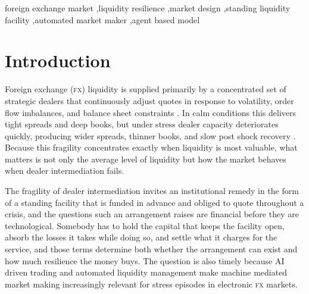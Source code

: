 \documentclass[a4paper,fleqn]{cas-sc}
\newcommand{\acro}[1]{\textsc{\MakeLowercase{#1}}\xspace}
\newcommand{\FX}{\acro{FX}}
\begin{document}
\begin{keywords}
foreign exchange market \sep liquidity resilience \sep market design \sep standing liquidity facility \sep automated market maker \sep agent based model
\end{keywords}

\maketitle

\section{Introduction}
\label{sec:intro}

Foreign exchange (\FX{}) liquidity is supplied primarily by a concentrated set of strategic dealers that continuously adjust quotes in response to volatility, order flow imbalances, and balance sheet constraints \citep{rime2013,bis2025,Brunnermeier2009}. In calm conditions this delivers tight spreads and deep books, but under stress dealer capacity deteriorates quickly, producing wider spreads, thinner books, and slow post shock recovery \citep{ranaldo2022,karnaukh,huang2024,bollerslev1994}. Because this fragility concentrates exactly when liquidity is most valuable, what matters is not only the average level of liquidity but how the market behaves when dealer intermediation fails.

The fragility of dealer intermediation invites an institutional remedy in the form of a standing facility that is funded in advance and obliged to quote throughout a crisis, and the questions such an arrangement raises are financial before they are technological. Somebody has to hold the capital that keeps the facility open, absorb the losses it takes while doing so, and settle what it charges for the service, and those terms determine both whether the arrangement can exist and how much resilience the money buys. The question is also timely because AI driven trading and automated liquidity management make machine mediated market making increasingly relevant for stress episodes in electronic \FX{} markets.
\end{document}
